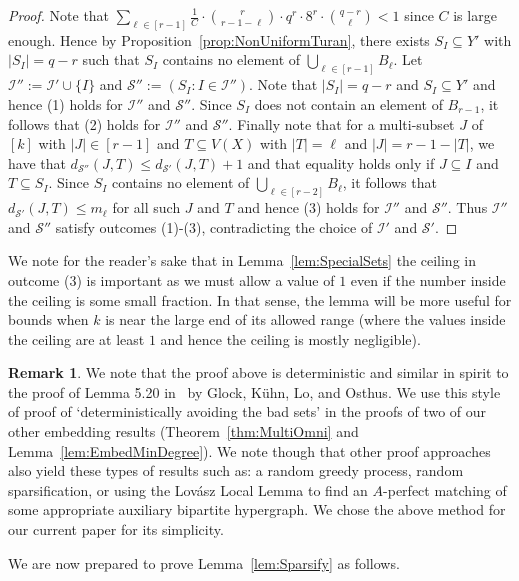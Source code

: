 \documentclass[11pt]{article}
\newcounter{i}
\theoremstyle{plain}
\theoremstyle{plain} %
\theoremstyle{definition}
\newtheorem{remark}[thm]{Remark}
\begin{document}
\begin{proof}
Note that $\sum_{\ell \in [r-1]} \frac{1}{C}\cdot \binom{r}{r-1-\ell} \cdot q^r\cdot 8^r \cdot \binom{q-r}{\ell} < 1$ since $C$ is large enough. Hence by Proposition~\ref{prop:NonUniformTuran}, there exists $S_{I}\subseteq Y'$ with $|S_{I}| = q-r$ such that $S_{I}$ contains no element of $\bigcup_{\ell \in [r-1]} B_{\ell}$. Let $\mathcal{I}'':=\mathcal{I}'\cup \{I\}$ and $\mathcal{S}'':=(S_I: I\in \mathcal{I}'')$. Note that $|S_I|=q-r$ and $S_I\subseteq Y'$ and hence (1) holds for $\mathcal{I}''$ and $\mathcal{S}''$. Since $S_I$ does not contain an element of $B_{r-1}$, it follows that (2) holds for $\mathcal{I}''$ and $\mathcal{S}''$. Finally note that for a multi-subset $J$ of $[k]$ with $|J|\in [r-1]$ and $T\subseteq V(X)$ with $|T|=\ell$ and $|J|=r-1-|T|$, we have that $d_{\mathcal{S}''}(J,T) \le d_{\mathcal{S}'}(J,T)+1$ and that equality holds only if $J\subseteq I$ and $T\subseteq S_I$. Since $S_I$ contains no element of $\bigcup_{\ell\in [r-2]} B_{\ell}$, it follows that $d_{\mathcal{S}'}(J,T)\le m_{\ell}$ for all such $J$ and $T$ and hence (3) holds for $\mathcal{I}''$ and $\mathcal{S}''$. Thus $\mathcal{I}''$ and $\mathcal{S}''$ satisfy outcomes (1)-(3), contradicting the choice of $\mathcal{I}'$ and $\mathcal{S}'$.
\end{proof}

We note for the reader's sake that in Lemma~\ref{lem:SpecialSets} the ceiling in outcome (3) is important as we must allow a value of $1$ even if the number inside the ceiling is some small fraction.  In that sense, the lemma will be more useful for bounds when $k$ is near the large end of its allowed range (where the values inside the ceiling are at least $1$ and hence the ceiling is mostly negligible).

\begin{remark}
We note that the proof above is deterministic and similar in spirit to the proof of Lemma 5.20 in~\cite{GKLO16} by Glock, K\"{u}hn, Lo, and Osthus. We use this style of proof of `deterministically avoiding the bad sets' in the proofs of two of our other embedding results (Theorem~\ref{thm:MultiOmni} and Lemma~\ref{lem:EmbedMinDegree}). We note though that other proof approaches also yield these types of results such as: a random greedy process, random sparsification, or using the Lov\'asz Local Lemma to find an $A$-perfect matching of some appropriate auxiliary bipartite hypergraph. We chose the above method for our current paper for its simplicity.    
\end{remark}

We are now prepared to prove Lemma~\ref{lem:Sparsify} as follows.
\end{document}
